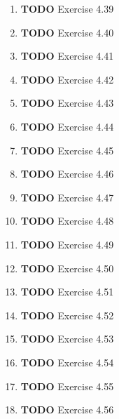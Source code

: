 \documentclass[11pt]{article}
\begin{document}
\begin{enumerate}
\begin{enumerate}
\item {\bfseries\sffamily TODO} Exercise 4.39
\label{sec:org5dfb7aa}

\item {\bfseries\sffamily TODO} Exercise 4.40
\label{sec:org023af85}

\item {\bfseries\sffamily TODO} Exercise 4.41
\label{sec:org1d9c26c}

\item {\bfseries\sffamily TODO} Exercise 4.42
\label{sec:org78e24cc}

\item {\bfseries\sffamily TODO} Exercise 4.43
\label{sec:org64ff5b4}

\item {\bfseries\sffamily TODO} Exercise 4.44
\label{sec:orga485d8a}

\item {\bfseries\sffamily TODO} Exercise 4.45
\label{sec:orgbee14df}

\item {\bfseries\sffamily TODO} Exercise 4.46
\label{sec:orgf824963}

\item {\bfseries\sffamily TODO} Exercise 4.47
\label{sec:orgc6f54ee}

\item {\bfseries\sffamily TODO} Exercise 4.48
\label{sec:orgda4cd0e}

\item {\bfseries\sffamily TODO} Exercise 4.49
\label{sec:org3187764}

\item {\bfseries\sffamily TODO} Exercise 4.50
\label{sec:orgd5be452}

\item {\bfseries\sffamily TODO} Exercise 4.51
\label{sec:org238943c}

\item {\bfseries\sffamily TODO} Exercise 4.52
\label{sec:org8d2ff65}

\item {\bfseries\sffamily TODO} Exercise 4.53
\label{sec:orgbd88b60}

\item {\bfseries\sffamily TODO} Exercise 4.54
\label{sec:orgabb6c53}

\item {\bfseries\sffamily TODO} Exercise 4.55
\label{sec:org8929100}

\item {\bfseries\sffamily TODO} Exercise 4.56
\label{sec:org847e00e}


\end{enumerate}
\end{enumerate}
\end{document}

